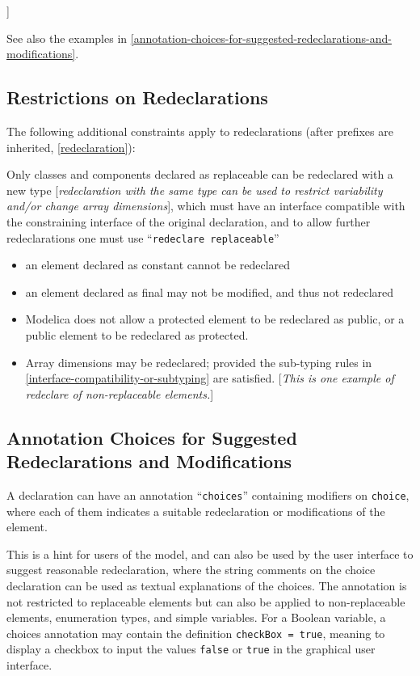 {]}

See also the examples in \autoref{annotation-choices-for-suggested-redeclarations-and-modifications}.

\subsection{Restrictions on Redeclarations}

The following additional constraints apply to redeclarations (after
prefixes are inherited, \autoref{redeclaration}):

Only classes and components declared as replaceable can be redeclared
with a new type {[}\emph{redeclaration with the same type can be used to
restrict variability and/or change array dimensions}{]}, which must have
an interface compatible with the constraining interface of the original
declaration, and to allow further redeclarations one must use
``\lstinline!redeclare replaceable!''

\begin{itemize}
\item
  an element declared as constant cannot be redeclared
\item
  an element declared as final may not be modified, and thus not
  redeclared
\item
  Modelica does not allow a protected element to be redeclared as
  public, or a public element to be redeclared as protected.
\item
  Array dimensions may be redeclared; provided the sub-typing rules in
  \autoref{interface-compatibility-or-subtyping} are satisfied. {[}\emph{This is one example of redeclare of
  non-replaceable elements.}{]}
\end{itemize}

\subsection{Annotation Choices for Suggested Redeclarations and Modifications}

A declaration can have an annotation ``\lstinline!choices!'' containing modifiers on
\lstinline!choice!, where each of them indicates a suitable redeclaration or
modifications of the element.

This is a hint for users of the model, and can also be used by the user
interface to suggest reasonable redeclaration, where the string comments
on the choice declaration can be used as textual explanations of the
choices. The annotation is not restricted to replaceable elements but
can also be applied to non-replaceable elements, enumeration types, and
simple variables. For a Boolean variable, a choices annotation may
contain the definition \lstinline!checkBox = true!, meaning to display a checkbox to
input the values \lstinline!false! or \lstinline!true! in the graphical user interface.

